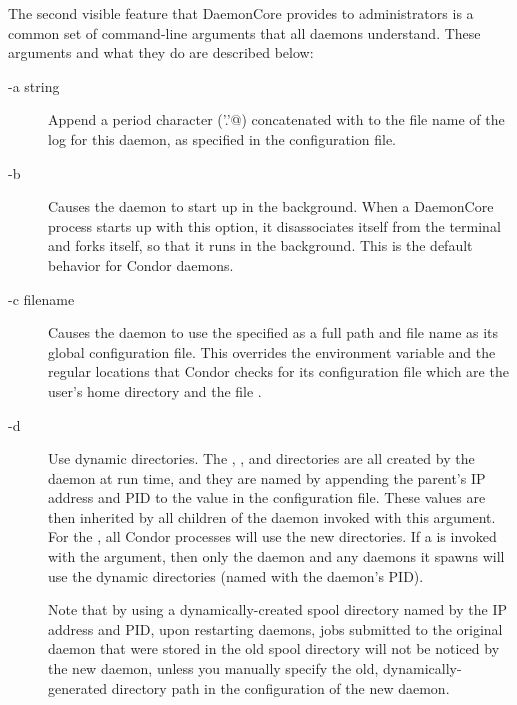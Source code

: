 The second visible feature that DaemonCore provides to administrators
is a common set of command-line arguments that all daemons understand.
These arguments and what they do are described below:

\begin{description}

\item[-a string] Append a period character (\verb@'.'@) concatenated with
   to the file name of the log for this daemon,
  as specified in the configuration file.

\item[-b] Causes the daemon to start up in the background.  When a
  DaemonCore process starts up with this option, it disassociates itself
  from the terminal and forks itself, so that it runs in the
  background.  This is the default behavior for Condor daemons.

\item[-c filename] Causes the daemon to use the specified 
  as a full path and file name as its global configuration file.  This
  overrides the  environment variable and the
  regular locations that Condor checks for its configuration file
  which are the  user's
  home directory and the file .  

\item[-d] Use dynamic directories.
 The , , and  directories
 are all created by the daemon at run time,
 and they are named by appending the
 parent's IP address and PID to the value in the 
 configuration file.
 These values are then inherited by all children of the daemon
 invoked with this  argument.
 For the ,
 all Condor processes will use the new directories.
 If a  is invoked with the  argument,
 then only the  daemon and any
  daemons it spawns will use the dynamic
 directories (named with the  daemon's PID).

 Note that by using a dynamically-created spool directory
 named by the IP address and PID,
 upon restarting daemons,
 jobs submitted to the original  daemon
 that were stored in the old spool directory will not be noticed
 by the new  daemon,
 unless you manually specify the old, dynamically-generated 
  directory path in the configuration of the
 new  daemon.


\end{description}
